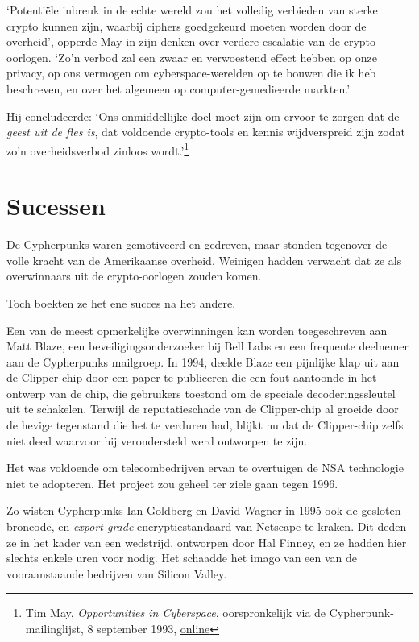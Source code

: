 \documentclass[
  a5paper,
  smalldemyvopaper,11pt,twoside,onecolumn,openright,extrafontsizes,
hidelinks]{memoir}
\begin{document}
`Potentiële inbreuk in de echte wereld zou het volledig verbieden van
sterke crypto kunnen zijn, waarbij ciphers goedgekeurd moeten worden
door de overheid', opperde May in zijn denken over verdere escalatie van
de crypto-oorlogen. `Zo'n verbod zal een zwaar en verwoestend effect
hebben op onze privacy, op ons vermogen om cyberspace-werelden op te
bouwen die ik heb beschreven, en over het algemeen op
computer-gemedieerde markten.'

Hij concludeerde: `Ons onmiddellijke doel moet zijn om ervoor te zorgen
dat de \emph{geest uit de fles is}, dat voldoende crypto-tools en kennis
wijdverspreid zijn zodat zo'n overheidsverbod zinloos wordt.'\footnote{Tim
  May, \emph{Opportunities in Cyberspace}, oorspronkelijk via de
  Cypherpunk-mailinglijst, 8 september 1993,
  \href{https://cypherpunks.venona.com/date/1993/09/msg00140.html}{online}}

\section{Sucessen}\label{sucessen}

De Cypherpunks waren gemotiveerd en gedreven, maar stonden tegenover de
volle kracht van de Amerikaanse overheid. Weinigen hadden verwacht dat
ze als overwinnaars uit de crypto-oorlogen zouden komen.

Toch boekten ze het ene succes na het andere.

Een van de meest opmerkelijke overwinningen kan worden toegeschreven aan
Matt Blaze, een beveiligingsonderzoeker bij Bell Labs en een frequente
deelnemer aan de Cypherpunks mailgroep. In 1994, deelde Blaze een
pijnlijke klap uit aan de Clipper-chip door een paper te publiceren die
een fout aantoonde in het ontwerp van de chip, die gebruikers toestond
om de speciale decoderingssleutel uit te schakelen. Terwijl de
reputatieschade van de Clipper-chip al groeide door de hevige tegenstand
die het te verduren had, blijkt nu dat de Clipper-chip zelfs niet deed
waarvoor hij verondersteld werd ontworpen te zijn.

Het was voldoende om telecombedrijven ervan te overtuigen de NSA
technologie niet te adopteren. Het project zou geheel ter ziele gaan
tegen 1996.

Zo wisten Cypherpunks Ian Goldberg en David Wagner in 1995 ook de
gesloten broncode, en \emph{export-grade} encryptiestandaard van
Netscape te kraken. Dit deden ze in het kader van een wedstrijd,
ontworpen door Hal Finney, en ze hadden hier slechts enkele uren voor
nodig. Het schaadde het imago van een van de vooraanstaande bedrijven
van Silicon Valley.
\end{document}
